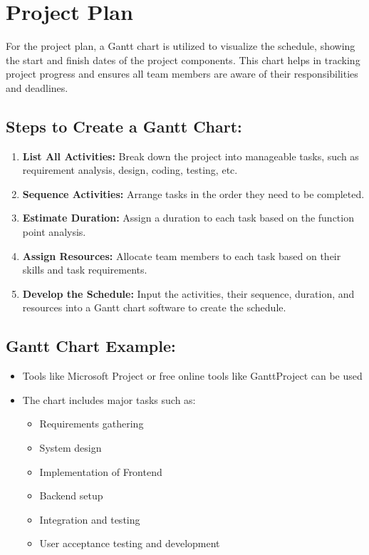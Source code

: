 \section{Project Plan}
\label{sec:project-plan}
For the project plan, a Gantt chart is utilized to visualize the schedule, showing the start and finish dates of the project components. This chart helps in tracking project progress and ensures all team members are aware of their responsibilities and deadlines.

\subsection*{Steps to Create a Gantt Chart:}
\begin{enumerate}
    \item \textbf{List All Activities:} Break down the project into manageable tasks, such as requirement analysis, design, coding, testing, etc.
    \item \textbf{Sequence Activities:} Arrange tasks in the order they need to be completed.
    \item \textbf{Estimate Duration:} Assign a duration to each task based on the function point analysis.

    \item \textbf{Assign Resources:} Allocate team members to each task based on their skills and task requirements.
    \item \textbf{Develop the Schedule:} Input the activities, their sequence, duration, and resources into a Gantt chart software to create the schedule.
\end{enumerate}

\subsection*{Gantt Chart Example:}
\begin{itemize}
    \item Tools like Microsoft Project or free online tools like GanttProject can be used
    \item The chart includes major tasks such as:
    \begin{itemize}
        \item Requirements gathering
        \item System design
        \item Implementation of Frontend
        \item Backend setup
        \item Integration and testing
        \item User acceptance testing and development
    \end{itemize}
\end{itemize}

